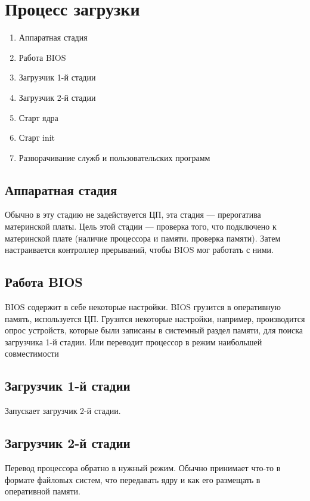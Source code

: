 \section{Процесс загрузки}

\begin{enumerate}
\item Аппаратная стадия
\item Работа BIOS
\item Загрузчик 1-й стадии
\item Загрузчик 2-й стадии
\item Старт ядра
\item Старт init
\item Разворачивание служб и пользовательских программ
\end{enumerate}


\setcounter{subsection}{-1}

\subsection{Аппаратная стадия}

Обычно в эту стадию не задействуется ЦП, эта стадия --- прерогатива материнской платы. Цель этой стадии --- проверка того, что подключено к материнской плате (наличие процессора и памяти. проверка памяти). Затем настраивается контроллер прерываний, чтобы BIOS мог работать с ними.

\subsection{Работа BIOS}

BIOS содержит в себе некоторые настройки. BIOS грузится в оперативную память, используется ЦП. Грузятся некоторые настройки, например, производится опрос устройств, которые были записаны в системный раздел памяти, для поиска загрузчика 1-й стадии. Или переводит процессор в режим наибольшей совместимости

\subsection{Загрузчик 1-й стадии}

Запускает загрузчик 2-й стадии.

\subsection{Загрузчик 2-й стадии}

Перевод процессора обратно в нужный режим. Обычно принимает что-то в формате файловых систем, что передавать ядру и как его размещать в оперативной памяти.

